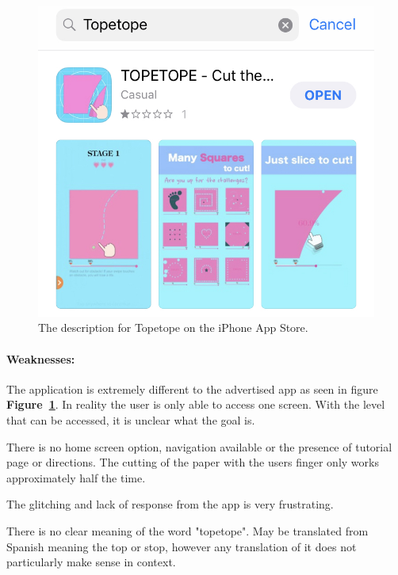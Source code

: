 \documentclass[11pt]{article}
\begin{document}
\begin{figure}[!ht]
\begin{minipage}{0.48\textwidth}
                            \centering
                            \includegraphics[width=0.85\linewidth]{Images/topeAdvertising.jpg}
                            \captionsetup{margin = 0.5cm}
                            \caption{The description for Topetope on the iPhone App Store.}
                            \label{fig:topeAdvertising}
                        \end{minipage}
                    \end{figure}
                    

                \paragraph{Weaknesses:}
                The application is extremely different to the advertised app as seen in figure \textbf{Figure~\ref{fig:topeAdvertising}}. In reality the user is only able to access one screen. With the level that can be accessed, it is unclear what the goal is.
                
                There is no home screen option, navigation available or the presence of tutorial page or directions. The cutting of the paper with the users finger only works approximately half the time.
                
                The glitching and lack of response from the app is very frustrating.
                
                
                There is no clear meaning of the word "topetope". May be translated from Spanish meaning the top or stop, however any translation of it does not particularly make sense in context. 
                
\end{document}
